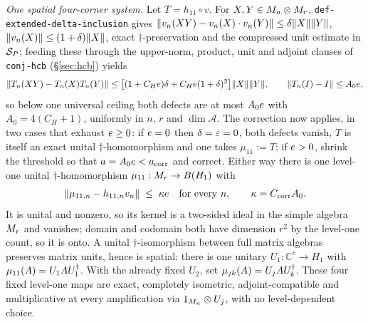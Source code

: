 \emph{One spatial four-corner system.} Let $T=h_{11}\circ v$. For $X,Y\in M_{n}\otimes M_{r}$,
\texttt{def-extended-delta-inclusion} gives
$\lVert v_n(XY)-v_n(X)\mathbin{\cdot} v_n(Y)\rVert\le\delta\lVert X\rVert\lVert Y\rVert$,
$\lVert v_n(X)\rVert\le(1+\delta)\lVert X\rVert$, exact $\dagger$-preservation and the compressed unit
estimate in $\mathcal S_{P}$; feeding these through the upper-norm, product, unit and adjoint
clauses of \texttt{conj-hcb} (\S\ref{sec:hcb}) yields
\[
  \lVert T_n(XY)-T_n(X)T_n(Y)\rVert\le\bigl[(1+C_He)\delta+C_He(1+\delta)^{2}\bigr]\lVert X\rVert\lVert Y\rVert,
  \qquad \lVert T_n(I)-I\rVert\le A_0e ,
\]
so below one universal ceiling both defects are at most $A_0e$ with $A_0=4(C_H+1)$,
uniformly in $n$, $r$ and $\dim\mathcal A$. The correction now applies, in two cases that
exhaust $e\ge0$: if $e=0$ then $\delta=\varepsilon=0$, both defects vanish, $T$ is itself
an exact unital $\dagger$-homomorphism and one takes $\mu_{11}:=T$; if $e>0$, shrink
the threshold so that $a=A_0e<a_{\mathrm{corr}}$ and correct. Either way there is one
level-one unital $\dagger$-homomorphism $\mu_{11}:M_{r}\to B(H_1)$ with
\begin{equation}\label{eq:extcb-mu11}
  \lVert \mu_{11,n}-h_{11,n}v_n\rVert\;\le\;\kappa e\quad\text{for every }n,
  \qquad \kappa=C_{\mathrm{corr}}A_0 .
\end{equation}
It is unital and nonzero, so its kernel is a two-sided ideal in the simple algebra
$M_{r}$ and vanishes; domain and codomain both have dimension $r^{2}$ by the level-one
count, so it is onto. A unital $\dagger$-isomorphism between full matrix algebras preserves
matrix units, hence is spatial: there is one unitary $U_1:\mathbb C^{r}\to H_1$ with
$\mu_{11}(A)=U_1AU_1^{\dagger}$. With the already fixed $U_2$, set $\mu_{jk}(A)=U_jAU_k^{\dagger}$. These
four fixed level-one maps are exact, completely isometric, adjoint-compatible and
multiplicative at every amplification via $1_{M_{n}}\otimes U_j$, with no level-dependent choice.

